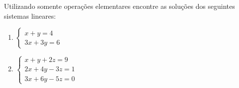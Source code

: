 \begin{exemplos}
	Utilizando somente operações elementares encontre as soluções dos seguintes sistemas lineares:
	\begin{enumerate}[label={\arabic*})]
		\item $\begin{cases}x + y = 4\\3x + 3y = 6\end{cases}$

		\item $\begin{cases}x + y + 2z = 9\\ 2x + 4y - 3z = 1\\ 3x + 6y - 5z = 0\end{cases}$
	\end{enumerate}


\end{exemplos}
